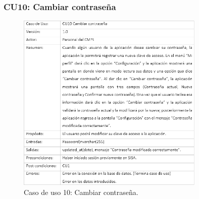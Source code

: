 			\newpage
			
		\subsubsection{CU10: Cambiar contraseña}
			\begin{figure}[htbp!]
				\centering
					\includegraphics[width=0.8\textwidth]{images/CU/CU10}
					\caption{Caso de uso 10: Cambiar contraseña.}
				\label{Tabla}
			\end{figure}
			
